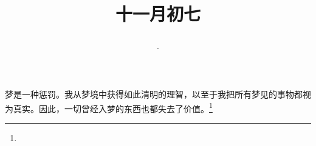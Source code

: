 \title{\date[d=7,m=12,y=2024][year:cn-y,年,month:cn,day:cn,日,·,weekday]·十一月初七 }
梦是一种惩罚。我从梦境中获得如此清明的理智，以至于我把所有梦见的事物都视为真实。因此，一切曾经入梦的东西也都失去了价值。\footnote{ }

